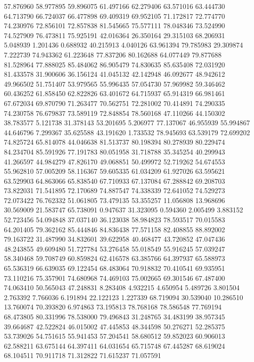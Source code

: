 57.876960
58.977895
59.896075
61.497166
62.279406
63.571016
63.444730
64.713790
66.724037
66.477898
69.409319
69.952105
71.172817
72.774770
74.230976
72.856101
72.857838
81.545665
75.577111
78.048346
73.524990
74.527909
76.473811
75.925191
42.016364
26.350164
29.315103
68.206931
5.048939
1.201436
0.688932
40.215913
4.040126
63.961394
79.785983
29.309874
7.222739
74.943362
61.223648
77.837206
80.162688
64.077449
79.877688
81.528964
77.888025
85.484062
86.905479
74.830635
85.635408
72.031920
81.433578
31.900606
36.156124
41.045132
42.142948
46.092677
48.942612
49.966502
51.751407
53.979565
55.996435
57.054730
57.969982
59.346462
60.436252
61.858450
62.822826
63.401672
64.715937
65.914319
66.981461
67.672034
69.870790
71.263477
70.562751
72.281002
70.414891
74.290335
74.230758
76.679837
73.589119
72.848854
78.560168
47.110266
44.150302
38.783577
5.121738
31.378143
53.201695
5.206977
77.137067
46.955939
55.994867
44.646796
7.299367
35.625588
43.191620
1.733532
78.945693
63.539179
72.699202
74.825724
65.814078
44.046638
81.513737
80.198394
80.278939
80.229474
84.234704
85.591926
77.191783
80.051958
31.718788
35.345254
40.299943
41.266597
44.984279
47.826170
49.068851
50.499972
52.719262
54.674553
55.962810
57.005209
58.116367
59.605335
61.034209
61.927026
63.595621
63.529903
64.863066
65.838540
67.710933
67.137084
67.288842
69.208703
73.822031
71.541895
72.170689
74.887547
74.338339
72.641052
74.529273
72.073422
76.762332
51.061805
73.479135
53.355257
11.056808
13.968696
30.569009
21.583747
65.738091
0.947637
31.323095
0.594360
2.005499
3.883152
52.723456
54.094848
37.037140
36.123038
58.984823
78.593517
70.015583
64.201405
79.362162
85.444846
84.836438
77.571158
82.408855
88.892002
79.163722
31.487990
34.832601
39.622958
40.468477
43.720852
47.047436
48.243855
49.609480
51.727784
53.276458
55.018549
55.916245
57.039247
58.340468
59.708749
60.859824
62.416578
63.385766
64.397937
65.588973
65.536319
66.639035
69.122454
68.483064
70.918832
70.410541
69.935951
73.110216
75.357901
74.680968
74.469103
75.002665
69.301546
67.487400
74.063410
50.565043
47.248831
8.283408
4.932215
4.650954
5.489726
3.801504
2.763392
7.766036
6.191894
22.122123
1.227339
68.719094
30.539040
10.286510
13.760074
70.393820
6.974863
73.195813
78.768168
78.586548
77.769194
68.473805
80.331996
78.538000
79.496843
31.248765
34.483199
38.957345
39.664687
42.522824
46.015002
47.445853
48.344598
50.276271
52.285375
53.739026
54.751615
55.941453
57.204541
58.680512
59.852023
60.906013
62.588211
63.675144
64.397411
64.031654
65.715748
67.445287
68.619024
68.104511
70.911718
71.312822
71.615237
71.057591
